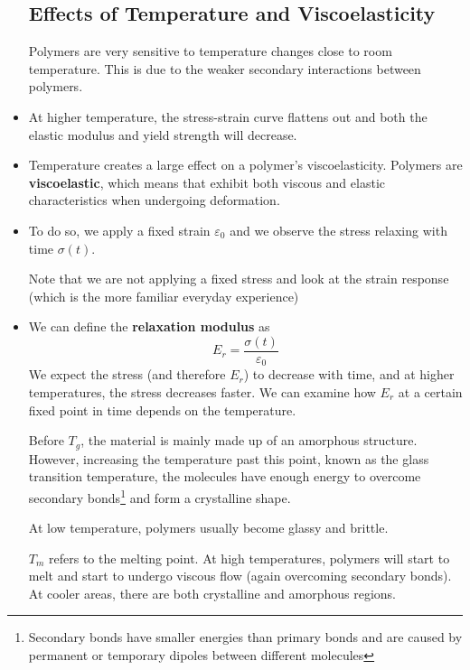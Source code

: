 \begin{itemize}
    \subsection{Effects of Temperature and Viscoelasticity}
    \begin{idea}
        Polymers are very sensitive to temperature changes close to room temperature. This is due to the weaker secondary interactions between polymers.
    \end{idea}
    \item At higher temperature, the stress-strain curve flattens out and both the elastic modulus and yield strength will decrease.
    \item Temperature creates a large effect on a polymer's viscoelasticity. Polymers are \textbf{viscoelastic}, which means that exhibit both viscous and elastic characteristics when undergoing deformation.
    \item To do so, we apply a fixed strain $\varepsilon_0$ and we observe the stress relaxing with time $\sigma(t)$.
    \begin{warning}
        Note that we are not applying a fixed stress and look at the strain response (which is the more familiar everyday experience)
    \end{warning}
    \item We can define the \textbf{relaxation modulus} as
    \begin{equation}
        E_r = \frac{\sigma (t)}{\varepsilon_0} 
    \end{equation}
    We expect the stress (and therefore $E_r$) to decrease with time, and at higher temperatures, the stress decreases faster. We can examine how $E_r$ at a certain fixed point in time depends on the temperature.
    \begin{figure}[ht]
        \centering
    \end{figure}
    Before $T_g$, the material is mainly made up of an amorphous structure. However, increasing the temperature past this point, known as the glass transition temperature, the molecules have enough energy to overcome secondary bonds\footnote{Secondary bonds have smaller energies than primary bonds and are caused by permanent or temporary dipoles between different molecules} and form a crystalline shape.
    \begin{idea}
        At low temperature, polymers usually become glassy and brittle.
    \end{idea}
    $T_m$ refers to the melting point. At high temperatures, polymers will start to melt and start to undergo viscous flow (again overcoming secondary bonds). At cooler areas, there are both crystalline and amorphous regions.

\end{itemize}
